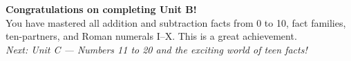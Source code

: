 \documentclass[12pt, letterpaper]{article}
\begin{document}
\bigskip
\begin{checkbox}
\textbf{\color{sd-green}Congratulations on completing Unit B!}\\[3pt]
You have mastered all addition and subtraction facts from 0 to 10, fact families,
ten-partners, and Roman numerals I--X. This is a great achievement.\\[3pt]
\textit{Next: Unit C — Numbers 11 to 20 and the exciting world of teen facts!}
\end{checkbox}
\end{document}
